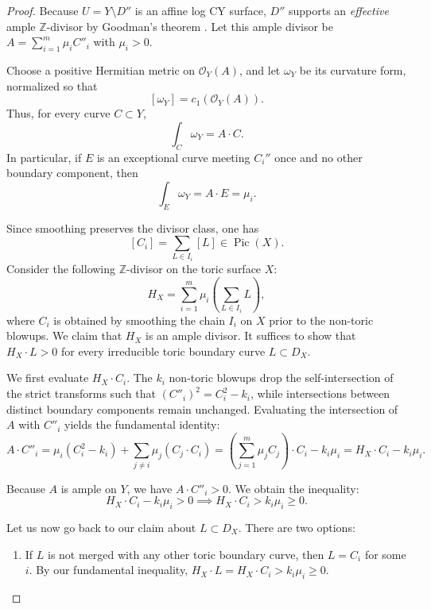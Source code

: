 \documentclass[11pt, reqno]{amsart}
\theoremstyle{definition}
\begin{document}
\begin{proof}

Because $U = Y \setminus D''$ is an affine log CY surface, $D''$ supports an \emph{effective} ample $\mathbb{Z}$-divisor by Goodman's theorem \cite[Theorem~2]{Goodman1969}. Let this ample divisor be $A = \sum_{i=1}^m \mu_i C''_i$ with $\mu_i>0$. 

Choose a positive Hermitian metric on $\mathcal{O}_Y(A)$, and let
$\omega_Y$ be its curvature form, normalized so that
\[
[\omega_Y]=c_1(\mathcal{O}_Y(A)).
\]
Thus, for every curve $C\subset Y$,
\[
\int_C\omega_Y=A\cdot C.
\]
In particular, if $E$ is an exceptional curve meeting $C_i''$ once and no other boundary component, then
\[
\int_E\omega_Y=A\cdot E=\mu_i.
\]

Since smoothing preserves the divisor class, one has
\[
[C_i]=\sum_{L\in I_i}[L]\in\operatorname{Pic}(X).
\]
Consider the following $\mathbb{Z}$-divisor on the toric surface $X$:
\[
H_X = \sum_{i=1}^m \mu_i \left( \sum_{L \in I_i} L \right),
\] where $C_i$ is obtained by smoothing the chain $I_i$ on $X$ prior to the non-toric blowups. We claim that $H_X$ is an ample divisor. It suffices to show that $H_X \cdot L > 0$ for every irreducible toric boundary curve $L \subset D_X$.



We first evaluate $H_X\cdot C_i$. The $k_i$ non-toric blowups drop the self-intersection of the strict transforms such that $(C''_i)^2 = C_i^2 - k_i$, while intersections between distinct boundary components remain unchanged. Evaluating the intersection of $A$ with $C''_i$ yields the fundamental identity:
\[
A \cdot C''_i = \mu_i(C_i^2 - k_i) + \sum_{j \neq i} \mu_j (C_j \cdot C_i) = \left( \sum_{j=1}^m \mu_j C_j \right) \cdot C_i - k_i \mu_i = H_X \cdot C_i - k_i \mu_i.
\]

Because $A$ is ample on $Y$, we have $A \cdot C''_i > 0$. We obtain the inequality:
\[
H_X \cdot C_i - k_i \mu_i > 0 \implies H_X \cdot C_i > k_i \mu_i \ge 0.
\]





Let us now go back to our claim about $L \subset D_X$. There are two options:

\begin{enumerate}

\item If $L$ is not merged with any other toric boundary curve, then $L = C_i$ for some $i$. By our fundamental inequality, $H_X \cdot L = H_X \cdot C_i > k_i \mu_i \ge 0$.



\end{enumerate}
\end{proof}
\end{document}
